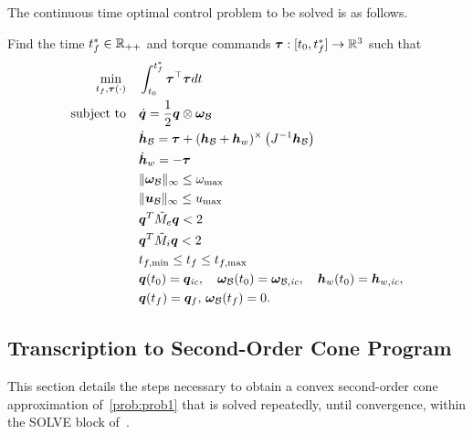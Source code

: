 \documentclass[10pt]{article}
\begin{document}
The continuous time optimal control problem to be solved is as follows. 
\begin{problem}\label{prob:prob1}
Find the time $t_f^*\in{\mathbb{R}}_{++}$ and torque commands $\bm{\tau} : [t_0,t_f^*] \rightarrow {\mathbb{R}}^3$ such that
\begin{subequations}
\begin{align}
\min_{t_f,\bm{\tau}(\cdot)} &\quad \int_{t_0}^{t_f^*} \bm{\tau}^{\top}\bm{\tau} dt \label{eq:prob_cost}\\
\text{subject to} &\quad \dot{\bm{q}} = \frac{1}{2} \bm{q} \otimes \bm{\omega}_{\mathcal{B}} \label{eq:prob_b}\\
&\quad \dot{\bm{h}}_{\mathcal{B}} = \bm{\tau} + (\bm{h}_{\mathcal{B}}+\bm{h}_w)^{\times} \left( J^{-1} \bm{h}_{\mathcal{B}} \right)\label{eq:prob_c}\\
&\quad \dot{\bm{h}}_w = -\bm{\tau} \\
&\quad \| \bm{\omega}_{\mathcal{B}} \|_{\infty} \leq \omega_{\max} \label{eq:prob_d}\\
&\quad \| \bm{u}_{\mathcal{B}} \|_{\infty} \leq u_{\max} \label{eq:prob_e}\\
&\quad \bm{q}^T \tilde{M}_e \bm{q} < 2 \label{eq:prob_f}\\
&\quad \bm{q}^T \tilde{M}_i \bm{q} < 2 \label{eq:prob_g}\\
&\quad t_{f,\min} \leq t_f \leq t_{f,\max} \label{eq:prob_h}\\
&\quad \bm{q}(t_0) = \bm{q}_\textit{ic},\quad \bm{\omega}_{\mathcal{B}}(t_0)=\bm{\omega}_{\mathcal{B},\textit{ic}},\quad \bm{h}_w(t_0)=\bm{h}_{w,\textit{ic}}, \\
&\quad \bm{q}(t_f) = \bm{q}_f,\,\bm{\omega}_{\mathcal{B}}(t_f) = 0.\label{eq:prob_i}
\end{align}
\end{subequations}
\end{problem} 

\subsection*{Transcription to Second-Order Cone Program}
This section details the steps necessary to obtain a convex second-order cone approximation of~\ref{prob:prob1} that is solved repeatedly, until convergence, within the SOLVE block of~.
\end{document}
